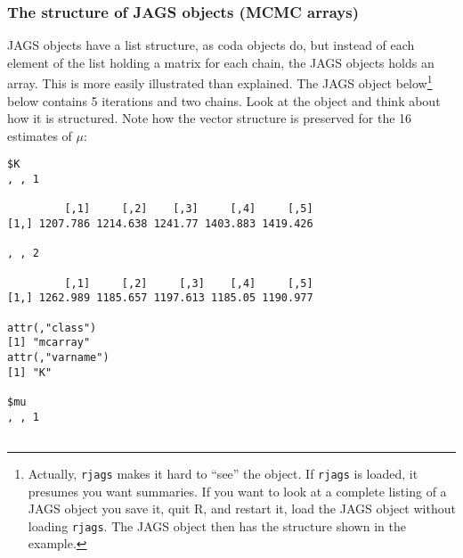 \documentclass[12pt,english]{article}
\begin{document}
{\subsubsection{The structure of JAGS objects (MCMC arrays)}

JAGS objects have a list structure, as coda objects do, but instead of each element of the list holding a matrix for each chain, the JAGS objects holds an array. This is more easily illustrated than explained. The JAGS object below\footnote{Actually, \texttt{rjags} makes it hard to ``see'' the object. If \texttt{rjags} is loaded, it presumes you want summaries. If you want to look at a complete listing of a JAGS object you save it, quit R, and restart it, load the JAGS object without loading \texttt{rjags}. The JAGS object then has the structure shown in the example.} below contains 5 iterations and two chains. Look at the object and think about how it is structured. Note how the vector structure is preserved for the 16 estimates of $\mu$:

\newpage

\begin{multicols}{2}
\begin{Verbatim}[fontsize=\tiny]
$K
, , 1

         [,1]     [,2]    [,3]     [,4]     [,5]
[1,] 1207.786 1214.638 1241.77 1403.883 1419.426

, , 2

         [,1]     [,2]     [,3]    [,4]     [,5]
[1,] 1262.989 1185.657 1197.613 1185.05 1190.977

attr(,"class")
[1] "mcarray"
attr(,"varname")
[1] "K"

$mu
, , 1


\end{Verbatim}
\end{multicols}}
\end{document}
